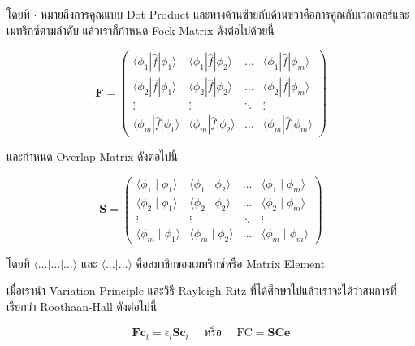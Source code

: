 \noindent โดยที่ $\cdot$ หมายถึงการคูณแบบ Dot Product และทางด้านซ้ายกับด้านขวาคือการคูณกับเวกเตอร์และเมทริกซ์ตามลำดับ
แล้วเราก็กำหนด Fock Matrix ดังต่อไปด้วยนี้

\begin{equation}
    \mathbf{F} 
    = \left(
        \begin{array}{cccc}
        \langle\phi_1|\hat{f}| \phi_1\rangle & \langle\phi_1|\hat{f}| \phi_2\rangle & 
            \ldots & \langle\phi_1|\hat{f}| \phi_m\rangle \\
        \langle\phi_2|\hat{f}| \phi_1\rangle & \langle\phi_2|\hat{f}| \phi_2\rangle & 
            \ldots & \langle\phi_2|\hat{f}| \phi_m\rangle \\
        \vdots & \vdots & \ddots & \vdots \\
        \langle\phi_m|\hat{f}| \phi_1\rangle & \langle\phi_m|\hat{f}| \phi_2\rangle & 
            \ldots & \langle\phi_m|\hat{f}| \phi_m\rangle
        \end{array}
    \right)
\end{equation}

\noindent และกำหนด Overlap Matrix ดังต่อไปนี้ 

\begin{equation}
    \mathbf{S} 
    = \left(
        \begin{array}{cccc}
        \langle\phi_1 \mid \phi_1\rangle & \langle\phi_1 \mid \phi_2\rangle & 
            \ldots & \langle\phi_1 \mid \phi_m\rangle \\
        \langle\phi_2 \mid \phi_1\rangle & \langle\phi_2 \mid \phi_2\rangle & 
            \ldots & \langle\phi_2 \mid \phi_m\rangle \\
        \vdots & \vdots & \ddots & \vdots \\
        \langle\phi_m \mid \phi_1\rangle & \langle\phi_m \mid \phi_2\rangle & 
            \ldots & \langle\phi_m \mid \phi_m\rangle
        \end{array}
    \right)
\end{equation}

\noindent โดยที่ $\langle \dots | \dots | \dots \rangle$ และ $\langle \dots | \dots \rangle$ 
คือสมาชิกของเมทริกซ์หรือ Matrix Element

เมื่อเรานำ Variation Principle และวิธี Rayleigh-Ritz ที่ได้ศึกษาไปแล้วเราจะได้ว่าสมการที่เรียกว่า Roothaan-Hall ดังต่อไปนี้

\begin{equation}
    \label{eq:Roothaan_Hall_equation}
    \mathbf{F c}_i 
    = \epsilon_i \mathbf{S c}_i \quad 
        \text{ หรือ } \quad 
        \mathrm{FC} = \mathbf{S C} \boldsymbol{e}
\end{equation}

